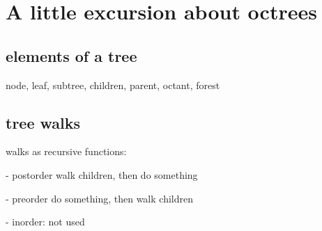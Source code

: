 
\section{A little excursion about octrees}

\subsection{elements of a tree}
node, leaf, subtree, children, parent, octant, forest

\subsection{tree walks}

walks as recursive functions:

- postorder
walk children, then do something

- preorder
do something, then walk children

- inorder:
not used